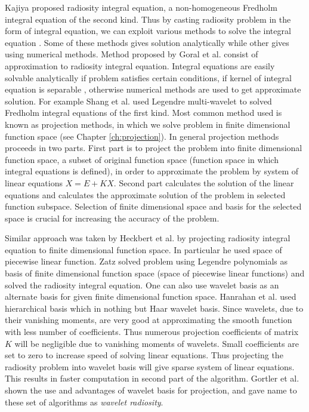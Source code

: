 Kajiya \cite{Kajiya} proposed radiosity integral equation, a non-homogeneous Fredholm integral equation of the second  kind.  Thus by casting radiosity problem in the form of integral equation,  we can exploit various methods to solve the integral equation \cite{iemethod1} \cite{iemethod2} \cite{ie} \cite{iesurvey} 
. Some of these methods gives solution analytically while other gives using numerical methods. Method proposed by Goral et al. \cite{Goral} consist of  approximation to radiosity integral equation.  Integral equations are easily solvable analytically if problem satisfies certain conditions, if kernel of integral equation is separable \cite{ie} \cite{iesurvey} , otherwise  numerical methods are used to get approximate solution. For example  Shang et al. \cite{shang} used Legendre multi-wavelet to solved Fredholm integral equations of the first kind. Most common method used is known as projection methods, in which we solve problem in finite dimensional function space (see Chapter \ref{ch:projection}). 
In general projection methods proceeds in two parts. First part is to project the problem into finite dimensional function space, a subset of original function space (function space in which integral equations is defined), in order to approximate the problem by system of linear equations $X=E+KX$. Second part calculates the solution of the linear equations and calculates the approximate solution of the problem in selected function subspace. Selection of finite dimensional space and basis for the selected space is crucial for increasing the accuracy of the problem.

Similar approach was taken by Heckbert et al. \cite{heckbert} by projecting radiosity integral equation to finite dimensional function space. In particular he used space of piecewise linear function. Zatz \cite{zatz} solved problem using Legendre polynomials as basis of finite dimensional function space (space of piecewise linear functions) and solved the radiosity integral equation. One can also use wavelet basis as an alternate basis for given finite dimensional function space. Hanrahan et al. \cite{hanarahan} used hierarchical basis which in nothing but Haar wavelet basis. Since wavelets, due to their vanishing moments, are very good at approximating the smooth function with less number of coefficients. Thus numerous projection coefficients of matrix $K$ will be negligible due to vanishing moments of wavelets. Small coefficients are set to zero to increase speed of solving linear equations. Thus projecting the radiosity problem into wavelet basis will give sparse system of linear equations. This results in faster computation in second part of the algorithm. Gortler et al. \cite{gortler} shown the use and advantages of wavelet basis for projection, and gave name to these set of algorithms as {\em wavelet radiosity}.



